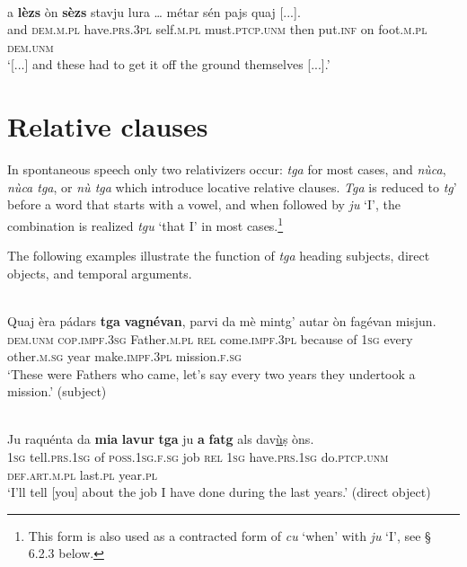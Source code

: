 \ea
\label{ex:sezs3pl}
\\
\gll [...] a \textbf{lèzs} òn \textbf{sèzs} stavju lura … métar sén pajs quaj [...]. \\
{} and \textsc{dem.m.pl} have.\textsc{prs.3pl} self.\textsc{m.pl} must.\textsc{ptcp.unm} then {} put.\textsc{inf} on foot.\textsc{m.pl} \textsc{dem.unm}\\
\glt `[...] and these had to get it off the ground themselves [...].'
\z


\section{Relative clauses}
In spontaneous speech only two relativizers occur: \textit{tga} for most cases, and \textit{nùca}, \textit{nùca tga}, or \textit{nù tga} which introduce locative relative clauses. \textit{Tga} is reduced to \textit{tg}' before a word that starts with a vowel, and when followed by \textit{ju} `I', the combination is realized \textit{tgu} `that I' in most cases.\footnote{This form is also used as a contracted form of \textit{cu} `when' with \textit{ju} `I', see § 6.2.3 below.}

The following examples illustrate the function of \textit{tga} heading subjects, direct objects, and temporal arguments.

\ea\label{}
\\
\gll   Quaj èra pádars \textbf{tga} \textbf{vagnévan}, parvi da mè mintg’ autar òn fagévan misjun. \\
\textsc{dem.unm} \textsc{cop.impf.3sg} Father.\textsc{m.pl} \textsc{rel} come.\textsc{impf.3pl} because of \textsc{1sg} every other.\textsc{m.sg} year make.\textsc{impf.3pl} mission.\textsc{f.sg} \\
\glt `These were Fathers who came, let’s say every two years they undertook a mission.' (subject)
\z

\ea\label{}
\\
\gll   Ju raquénta da \textbf{mia} \textbf{lavur} \textbf{tga} ju \textbf{\textbf{a}} \textbf{fatg} als dav\underline{ù}ṣ òns. \\
\textsc{1sg} tell.\textsc{prs.1sg} of \textsc{poss.1sg.f.sg} job \textsc{rel} \textsc{1sg}  have.\textsc{prs.1sg} do.\textsc{ptcp.unm} \textsc{def.art.m.pl} last.\textsc{pl} year.\textsc{pl}\\
\glt `I’ll tell [you] about the job I have done during the last years.' (direct object)
\z

